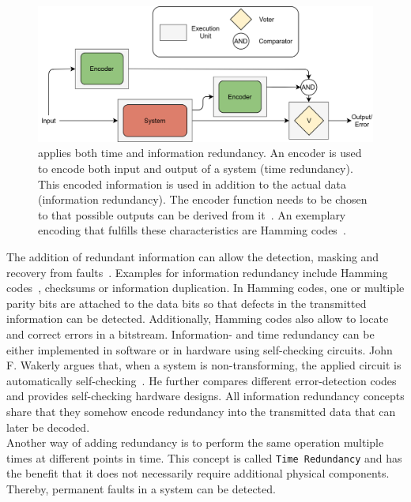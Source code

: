 \begin{figure}[!hb]
	\centering
	\includegraphics[width=0.75\linewidth]{images/ECC}
	\caption{ applies both time and information redundancy. An encoder is used to encode both input and output of a system (time redundancy). This encoded information is used in addition to the actual data (information redundancy). The encoder function needs to be chosen to that possible outputs can be derived from it~\cite{Su2005ECC}. An exemplary encoding that fulfills these characteristics are Hamming codes~\cite{HammingCodes}.}
	\label{fig:ECC}
\end{figure}

The addition of redundant information can allow the detection, masking and recovery from faults~\cite{BarryFaultToleranceAnalysis}.
Examples for information redundancy include Hamming codes~\cite{HammingCodes}, checksums or information duplication.
In Hamming codes, one or multiple parity bits are attached to the data bits so that defects in the transmitted information can be detected.
Additionally, Hamming codes also allow to locate and correct errors in a bitstream.
Information- and time redundancy can be either implemented in software or in hardware using self-checking circuits.
John F. Wakerly argues that, when a system is non-transforming, the applied circuit is automatically self-checking~\cite{SelfCheckingProcessorDesign}.
He further compares different error-detection codes and provides self-checking hardware designs.
All information redundancy concepts share that they somehow encode redundancy into the transmitted data that can later be decoded.
\\

Another way of adding redundancy is to perform the same operation multiple times at different points in time.
This concept is called \texttt{Time Redundancy} and has the benefit that it does not necessarily require additional physical components.
Thereby, permanent faults in a system can be detected.

